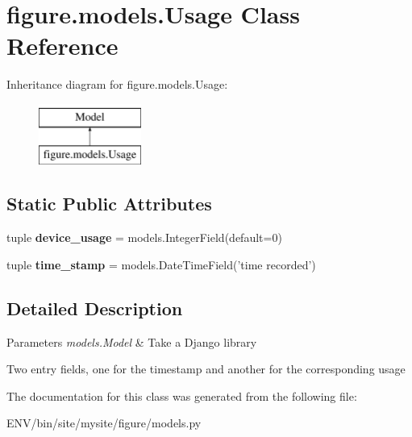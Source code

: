 \hypertarget{classfigure_1_1models_1_1Usage}{\section{figure.\-models.\-Usage Class Reference}
\label{classfigure_1_1models_1_1Usage}
}
Inheritance diagram for figure.\-models.\-Usage\-:\begin{figure}[H]
\begin{center}
\leavevmode
\includegraphics[height=2.000000cm]{classfigure_1_1models_1_1Usage}
\end{center}
\end{figure}
\subsection*{Static Public Attributes}
\begin{DoxyCompactItemize}
\item 
\hypertarget{classfigure_1_1models_1_1Usage_a2d464c09f55e5e5b070fa99db516c6f8}{tuple {\bfseries device\-\_\-usage} = models.\-Integer\-Field(default=0)}\label{classfigure_1_1models_1_1Usage_a2d464c09f55e5e5b070fa99db516c6f8}

\item 
\hypertarget{classfigure_1_1models_1_1Usage_a2390a648c52d4f0f98826581cea8963c}{tuple {\bfseries time\-\_\-stamp} = models.\-Date\-Time\-Field('time recorded')}\label{classfigure_1_1models_1_1Usage_a2390a648c52d4f0f98826581cea8963c}

\end{DoxyCompactItemize}


\subsection{Detailed Description}

\begin{DoxyParams}{Parameters}
{\em models.\-Model} & Take a Django library\\
\hline
\end{DoxyParams}
Two entry fields, one for the timestamp and another for the corresponding usage 

The documentation for this class was generated from the following file\-:\begin{DoxyCompactItemize}
\item 
E\-N\-V/bin/site/mysite/figure/models.\-py\end{DoxyCompactItemize}
